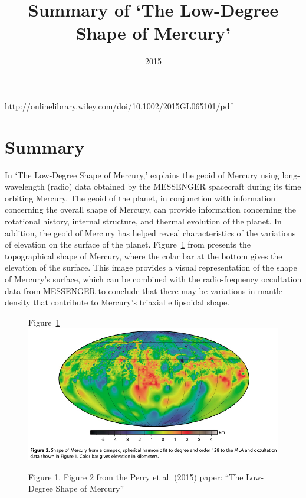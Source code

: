 \documentclass{article}
\begin{document}
\title{\vspace{-10mm}\bf{\Large{Summary of `The Low-Degree Shape of Mercury'}}}
\author{}
\date{2015}
\maketitle

http://onlinelibrary.wiley.com/doi/10.1002/2015GL065101/pdf

\vspace{5mm}
\section{Summary}

In `The Low-Degree Shape of Mercury,' \cite{Perry15} explains the geoid of Mercury using long-wavelength (radio) data obtained by the MESSENGER spacecraft during its time orbiting Mercury. The geoid of the planet, in conjunction with information concerning the overall shape of Mercury, can provide information concerning the rotational history, internal structure, and thermal evolution of the planet. In addition, the geoid of Mercury has helped reveal characteristics of the variations of elevation on the surface of the planet. Figure~\ref{fig:MercuryMap} from \cite{Perry15} presents the topographical shape of Mercury, where the colar bar at the bottom gives the elevation of the surface. This image provides a visual representation of the shape of Mercury's surface, which can be combined with the radio-frequency occultation data from MESSENGER to conclude that there may be variations in mantle density that contribute to Mercury's triaxial ellipsoidal shape.



\begin{figure}[ht]
\begin{center}
{\sc Figure~\ref{fig:MercuryMap}}
\linebreak
\linebreak
\includegraphics[scale=0.5]{MercuryMap.png}
\end{center}{
\footnotesize {\sc Figure 1.} Figure 2 from the Perry et al. (2015) paper: ``The Low-Degree Shape of Mercury''}
\label{fig:MercuryMap}
\end{figure}




\end{document}
